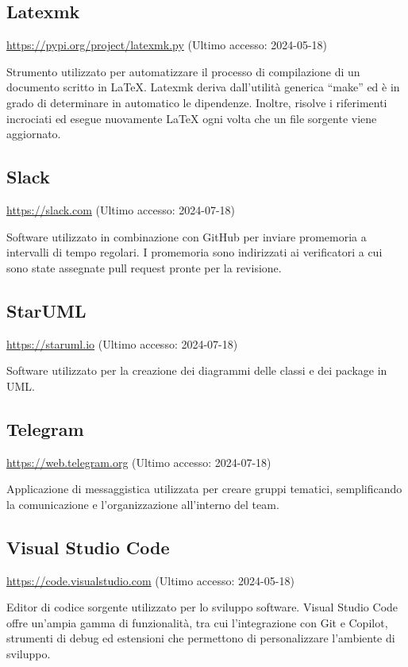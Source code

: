 \subsection{Latexmk}
\par \href{https://pypi.org/project/latexmk.py/}{https://pypi.org/project/latexmk.py} (Ultimo accesso: 2024-05-18)
\par Strumento utilizzato per automatizzare il processo di compilazione di un documento scritto in LaTeX. Latexmk deriva dall'utilità generica “make” ed è in grado di determinare in automatico le dipendenze. Inoltre, risolve i riferimenti incrociati ed esegue nuovamente LaTeX ogni volta che un file sorgente viene aggiornato.

\subsection{Slack}
\par \href{https://slack.com}{https://slack.com} (Ultimo accesso: 2024-07-18)
\par Software utilizzato in combinazione con GitHub per inviare promemoria a intervalli di tempo regolari. I promemoria sono indirizzati ai verificatori a cui sono state assegnate pull request pronte per la revisione.

\subsection{StarUML}
\par \href{https://staruml.io}{https://staruml.io} (Ultimo accesso: 2024-07-18)
\par Software utilizzato per la creazione dei diagrammi delle classi e dei package in UML.

\subsection{Telegram}
\par \href{https://web.telegram.org}{https://web.telegram.org} (Ultimo accesso: 2024-07-18)
\par Applicazione di messaggistica utilizzata per creare gruppi tematici, semplificando la comunicazione e l'organizzazione all'interno del team.
    
\subsection{Visual Studio Code}
\par \href{https://code.visualstudio.com}{https://code.visualstudio.com} (Ultimo accesso: 2024-05-18)
\par Editor di codice sorgente utilizzato per lo sviluppo software. Visual Studio Code offre un’ampia gamma di funzionalità, tra cui l'integrazione con Git e Copilot, strumenti di debug ed estensioni che permettono di personalizzare l’ambiente di sviluppo.
